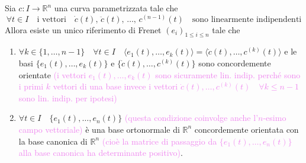         \newpage
        \begin{teorema} 
        \label{th:esistenza_e_unicita_del_riferimento_canonico_di_Frenet}
        \mbox{}

        Sia $c: I \to \mathbb{R}^n$ una curva parametrizzata tale che 
        \begin{equation}
        \label{eq:ipotesi_teorema_di_esistenza_e_unicita_del_riferimento_canonico_di_Frenet}
        \forall t \in I \quad \text{i vettori} \quad \dot{c}(t), \, \ddot{c}(t), \, \dots, \, c^{(n-1)}(t) \quad \text{sono linearmente indipendenti}
        \end{equation}
        Allora esiste un unico riferimento di Frenet $(e_i)_{1 \leq i \leq n}$ tale che 
        \begin{enumerate}
            \item $\forall k \in \{1, \dots, n-1\} \quad \forall t \in I \quad \langle e_1(t), \dots, e_k(t) \rangle = \langle \dot{c}(t), \dots, c^{(k)}(t) \rangle$ e
            le basi $\{ e_1(t), \dots, e_k(t) \}$ e $\{ \dot{c}(t), \dots, c^{(k)}(t) \}$ sono concordemente orientate \textcolor{violet}{(i vettori $e_1(t), \dots, e_k(t)$ 
            sono sicuramente lin. indip. perché sono i primi $k$ vettori di una base invece i vettori $\dot{c}(t), \dots, c^{(k)}(t) \quad \forall k \leq n-1$ sono lin. indip. 
            per ipotesi)}
            \item $\forall t \in I \quad \{ e_1(t), \dots, e_n(t) \}$ \textcolor{violet}{(questa condizione coinvolge anche l'$n$-esimo campo vettoriale)}  è una base ortonormale di  $\mathbb{R}^n$ concordemente 
            orientata con la base canonica di $\mathbb{R}^n$ \textcolor{violet}{(cioè la matrice di passaggio da $\{ e_1(t), \dots, e_n(t) \}$ alla base canonica ha determinante positivo)}.
        \end{enumerate}
        \end{teorema}
